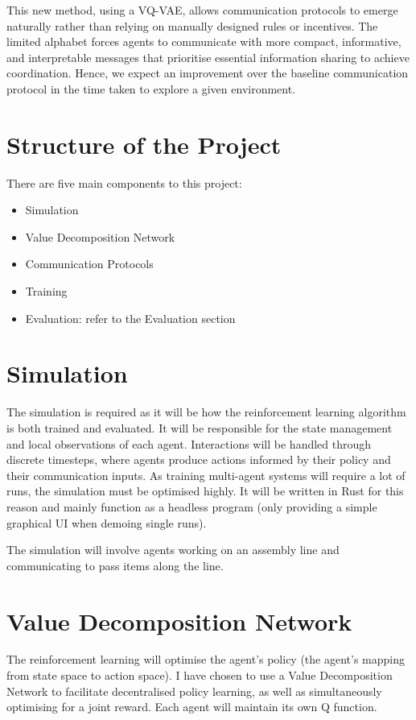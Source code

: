 This new method, using a VQ-VAE, allows communication protocols to emerge naturally rather than relying on manually designed rules or incentives. The limited alphabet forces agents to communicate with more compact, informative, and interpretable messages that prioritise essential information sharing to achieve coordination. Hence, we expect an improvement over the baseline communication protocol in the time taken to explore a given environment.

\pagebreak
\section{Structure of the Project}
There are five main components to this project:

\begin{itemize}
\item Simulation
\item Value Decomposition Network
\item Communication Protocols
\item Training
\item Evaluation: refer to the Evaluation section
\end{itemize}

\section*{Simulation}
The simulation is required as it will be how the reinforcement learning algorithm is both trained and evaluated. It will be responsible for the state management and local observations of each agent. Interactions will be handled through discrete timesteps, where agents produce actions informed by their policy and their communication inputs.  As training multi-agent systems will require a lot of runs, the simulation must be optimised highly. It will be written in Rust for this reason and mainly function as a headless program (only providing a simple graphical UI when demoing single runs).

The simulation will involve agents working on an assembly line and communicating to pass items along the line.

\section*{Value Decomposition Network}
The reinforcement learning will optimise the agent's policy (the agent's mapping from state space to action space). I have chosen to use a Value Decomposition Network to facilitate decentralised policy learning, as well as simultaneously optimising for a joint reward. Each agent will maintain its own Q function.

